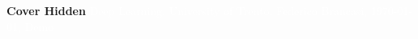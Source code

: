 \documentclass[11pt,fleqn,oneside]{book} %
\newcommand{\AUTHOR}{Federico Brancasi}
\newcommand{\DATE}{\today}
\newcommand{\TITLE}{Deep Learning}
\newcommand{\SUBTITLE}{University of Trento}
\newcommand{\SUBJECT}{Demo}
\renewcommand{\coverpage}[5]{{\Huge\textbf{Cover Hidden}}
    \textcolor{white}{#1, #2, #3, #4, #5}}
\begin{document}

\coverpage{\TITLE}{\SUBTITLE}{\AUTHOR}{\DATE}{\SUBJECT}

\newpage
\tableofcontents


%


% 

% 

% 

% 

% 

% 

% 
\end{document}
